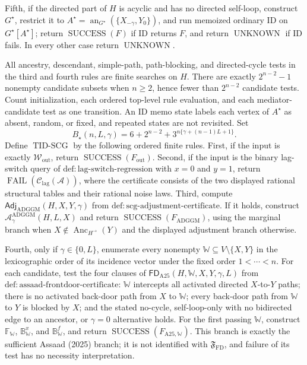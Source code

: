 Fifth, if the directed part of \(H\) is acyclic and has no directed self-loop, construct \(G^\star\), restrict it to \(A^\star=\operatorname{an}_{G^\star}(\{X_{-\gamma},Y_0\})\), and run memoized ordinary ID on \(G^\star[A^\star]\); return \(\operatorname{SUCCESS}(F)\) if ID returns \(F\), and return \(\operatorname{UNKNOWN}\) if ID fails.  In every other case return \(\operatorname{UNKNOWN}\).

All ancestry, descendant, simple-path, path-blocking, and directed-cycle tests in the third and fourth rules are finite searches on \(H\).  There are exactly \(2^{n-2}-1\) nonempty candidate subsets when \(n\ge2\), hence fewer than \(2^{n-2}\) candidate tests.  Count initialization, each ordered top-level rule evaluation, and each mediator-candidate test as one transition.  An ID memo state labels each vertex of \(A^\star\) as absent, random, or fixed, and repeated states are not revisited.  Set
\[
 B_\star(n,L,\gamma)
 =6+2^{n-2}+3^{n\{\gamma+(n-1)L+1\}}.
\]
Define \(\operatorname{TID\text{-}SCG}\) by the following ordered finite rules.  First, if the input is exactly \(\mathcal W_{\mathrm{out}}\), return \(\operatorname{SUCCESS}(F_{\mathrm{out}})\).  Second, if the input is the binary lag-switch query of \(\mathrm{def:lag\text{-}switch\text{-}regression}\) with \(x=0\) and \(y=1\), return \(\operatorname{FAIL}(\mathcal C_{\mathrm{lag}}(\mathcal A))\), where the certificate consists of the two displayed rational structural tables and their rational noise laws.  Third, compute \(\mathsf{Adj}_{\mathrm{ADGGM}}(H,X,Y,\gamma)\) from \(\mathrm{def:scg\text{-}adjustment\text{-}certificate}\).  If it holds, construct \(\mathcal A_{\gamma}^{\mathrm{ADGGM}}(H,L,X)\) and return \(\operatorname{SUCCESS}(F_{\mathrm{ADGGM}})\), using the marginal branch when \(X\notin\operatorname{Anc}_{H^{\to}}(Y)\) and the displayed adjustment branch otherwise.

Fourth, only if \(\gamma\in\{0,L\}\), enumerate every nonempty \(\mathbb W\subseteq V\setminus\{X,Y\}\) in the lexicographic order of its incidence vector under the fixed order \(1<\cdots<n\).  For each candidate, test the four clauses of \(\mathsf{FD}_{\mathrm{A25}}(H,\mathbb W,X,Y,\gamma,L)\) from \(\mathrm{def:assaad\text{-}frontdoor\text{-}certificate}\): \(\mathbb W\) intercepts all activated directed \(X\)-to-\(Y\) paths; there is no activated back-door path from \(X\) to \(\mathbb W\); every back-door path from \(\mathbb W\) to \(Y\) is blocked by \(X\); and the stated no-cycle, self-loop-only with no bidirected edge to an ancestor, or \(\gamma=0\) alternative holds.  For the first passing \(\mathbb W\), construct \(\mathbb F_{\mathbb W}\), \(\mathbb B^x_{\mathbb W}\), and \(\mathbb B^f_{\mathbb W}\), and return \(\operatorname{SUCCESS}(F_{\mathrm{A25},\mathbb W})\).  This branch is exactly the sufficient Assaad (2025) branch; it is not identified with \(\mathfrak F_{\mathrm{FD}}\), and failure of its test has no necessity interpretation.

